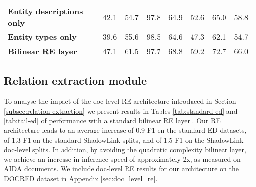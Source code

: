 \documentclass[11pt]{article}
\begin{document}
\begin{table*}[h]
{\begin{tabular}{@{}lccccccc@{}}
\textbf{Entity descriptions only}                          & {42.1}      & {54.7} & \multicolumn{1}{c|}{{97.8}}    & \multicolumn{1}{c|}{{ 64.9}}    & 52.6                & \multicolumn{1}{c|}{65.0}               & 58.8             \\

\textbf{Entity types only}                          & {39.6}      & {55.6} & \multicolumn{1}{c|}{{98.5}}    & \multicolumn{1}{c|}{{ 64.6}}    & 47.3                & \multicolumn{1}{c|}{62.1}               & 54.7             \\

\textbf{Bilinear RE layer}  & 47.1 & 61.5 & \multicolumn{1}{c|}{{97.7}}  & \multicolumn{1}{c|}{{ 68.8}} & 59.2 & \multicolumn{1}{c|}{72.7} & 66.0 \\

\bottomrule
\end{tabular}
}
\caption{Entity disambiguation InKB micro F1 scores on ShadowLink test sets. SHADOW-DOC and TOP-DOC refers to the extended version of the dataset which includes the full-text of the document to use as additional context. The best value is \textbf{bold}. We produced results using the code released by the authors.}
\label{tab:tail-ed}
\end{table*}


\subsection{Relation extraction module}

To analyse the impact of the doc-level RE architecture introduced in Section \ref{subsec:relation-extraction} we present results in Tables \ref{tab:standard-ed} and \ref{tab:tail-ed} of performance with a standard bilinear RE layer \cite{ssan}. Our RE architecture leads to an average increase of 0.9 F1 on the standard ED datasets, of 1.3 F1 on the standard ShadowLink splits, and of 1.5 F1 on the ShadowLink doc-level splits. In addition, by avoiding the quadratic complexity bilinear layer, we achieve an increase in inference speed of approximately 2x, as measured on AIDA documents. We include doc-level RE results for our architecture on the DOCRED \cite{docred} dataset in Appendix \ref{sec:doc_level_re}.
\end{document}
